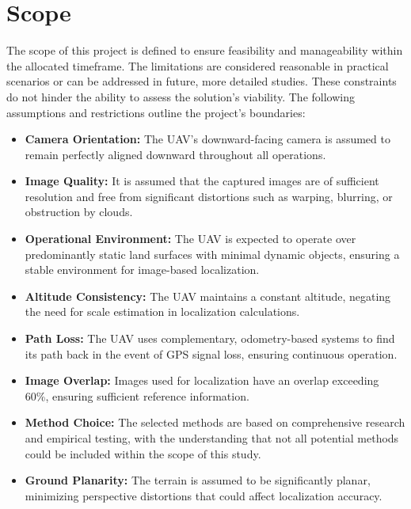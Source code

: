 \section{Scope}
The scope of this project is defined to ensure feasibility and manageability within the allocated timeframe. The limitations are considered reasonable in practical scenarios or can be addressed in future, more detailed studies. These constraints do not hinder the ability to assess the solution's viability. The following assumptions and restrictions outline the project's boundaries:


\begin{itemize}
    \item \textbf{Camera Orientation:} The UAV's downward-facing camera is assumed to remain perfectly aligned downward throughout all operations.
    
    \item \textbf{Image Quality:} It is assumed that the captured images are of sufficient resolution and free from significant distortions such as warping, blurring, or obstruction by clouds.
    
    \item \textbf{Operational Environment:} The UAV is expected to operate over predominantly static land surfaces with minimal dynamic objects, ensuring a stable environment for image-based localization.
    
    \item \textbf{Altitude Consistency:} The UAV maintains a constant altitude, negating the need for scale estimation in localization calculations.
    
    \item \textbf{Path Loss:} The UAV uses complementary, odometry-based systems to find its path back in the event of GPS signal loss, ensuring continuous operation.
    
    \item \textbf{Image Overlap:} Images used for localization have an overlap exceeding 60\%, ensuring sufficient reference information.
    
    \item \textbf{Method Choice:} The selected methods are based on comprehensive research and empirical testing, with the understanding that not all potential methods could be included within the scope of this study.
    
    \item \textbf{Ground Planarity:} The terrain is assumed to be significantly planar, minimizing perspective distortions that could affect localization accuracy.
    

\end{itemize}
